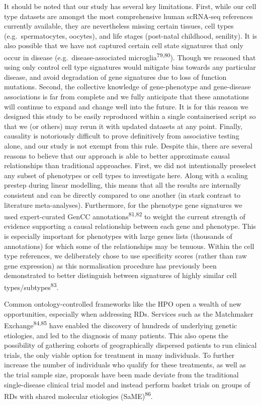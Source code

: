 \documentclass[
]{article}
\begin{document}
It should be noted that our study has several key limitations. First,
while our cell type datasets are amongst the most comprehensive human
scRNA-seq references currently available, they are nevertheless missing
certain tissues, cell types (e.g.~spermatocytes, oocytes), and life
stages (post-natal childhood, senility). It is also possible that we
have not captured certain cell state signatures that only occur in
disease (e.g.~disease-associated microglia\textsuperscript{79,80}).
Though we reasoned that using only control cell type signatures would
mitigate bias towards any particular disease, and avoid degradation of
gene signatures due to loss of function mutations. Second, the
collective knowledge of gene-phenotype and gene-disease associations is
far from complete and we fully anticipate that these annotations will
continue to expand and change well into the future. It is for this
reason we designed this study to be easily reproduced within a single
containerised script so that we (or others) may rerun it with updated
datasets at any point. Finally, causality is notoriously difficult to
prove definitively from associative testing alone, and our study is not
exempt from this rule. Despite this, there are several reasons to
believe that our approach is able to better approximate causal
relationships than traditional approaches. First, we did not
intentionally preselect any subset of phenotypes or cell types to
investigate here. Along with a scaling prestep during linear modelling,
this means that all the results are internally consistent and can be
directly compared to one another (in stark contrast to literature
meta-analyses). Furthermore, for the phenotype gene signatures we used
expert-curated GenCC annotations\textsuperscript{81,82} to weight the
current strength of evidence supporting a causal relationship between
each gene and phenotype. This is especially important for phenotypes
with large genes lists (thousands of annotations) for which some of the
relationships may be tenuous. Within the cell type references, we
deliberately chose to use specificity scores (rather than raw gene
expression) as this normalisation procedure has previously been
demonstrated to better distinguish between signatures of highly similar
cell types/subtypes\textsuperscript{83}.

Common ontology-controlled frameworks like the HPO open a wealth of new
opportunities, especially when addressing RDs. Services such as the
Matchmaker Exchange\textsuperscript{84,85} have enabled the discovery of
hundreds of underlying genetic etiologies, and led to the diagnosis of
many patients. This also opens the possibility of gathering cohorts of
geographically dispersed patients to run clinical trials, the only
viable option for treatment in many individuals. To further increase the
number of individuals who qualify for these treatments, as well as the
trial sample size, proposals have been made deviate from the traditional
single-disease clinical trial model and instead perform basket trials on
groups of RDs with shared molecular etiologies
(SaME)\textsuperscript{86}.
\end{document}
